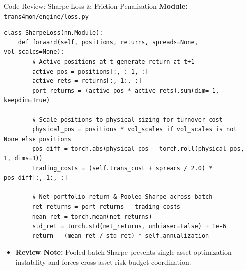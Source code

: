 \documentclass[10pt]{beamer}
\begin{document}
\begin{frame}[fragile]{Code Review: Sharpe Loss \& Friction Penalisation}
  \textbf{\scriptsize Module:} \texttt{trans4mom/engine/loss.py}
\begin{lstlisting}
class SharpeLoss(nn.Module):
    def forward(self, positions, returns, spreads=None, vol_scales=None):
        # Active positions at t generate return at t+1
        active_pos = positions[:, :-1, :]
        active_rets = returns[:, 1:, :]
        port_returns = (active_pos * active_rets).sum(dim=-1, keepdim=True)
        
        # Scale positions to physical sizing for turnover cost
        physical_pos = positions * vol_scales if vol_scales is not None else positions
        pos_diff = torch.abs(physical_pos - torch.roll(physical_pos, 1, dims=1))
        trading_costs = (self.trans_cost + spreads / 2.0) * pos_diff[:, 1:, :]
        
        # Net portfolio return & Pooled Sharpe across batch
        net_returns = port_returns - trading_costs
        mean_ret = torch.mean(net_returns)
        std_ret = torch.std(net_returns, unbiased=False) + 1e-6
        return - (mean_ret / std_ret) * self.annualization
\end{lstlisting}
  \begin{itemize}\tiny
    \item \textbf{Review Note:} Pooled batch Sharpe prevents single-asset optimization instability and forces cross-asset risk-budget coordination.
  \end{itemize}
\end{frame}
\end{document}
